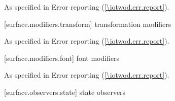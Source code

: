 \begin{itemdecl}
\end{itemdecl}
\begin{itemdescr}
\pnum
\effects


\pnum
\postconditions


\pnum
\throws
As specified in Error reporting (\ref{\iotwod.err.report}).


\pnum
\remarks


\pnum
\errors


\pnum
\realnotes


\end{itemdescr}

 [surface.modifiers.transform] { transformation modifiers}

\begin{itemdecl}
\end{itemdecl}
\begin{itemdescr}
\pnum
\effects


\pnum
\postconditions


\pnum
\throws
As specified in Error reporting (\ref{\iotwod.err.report}).


\pnum
\remarks


\pnum
\errors


\pnum
\realnotes


\end{itemdescr}


 [surface.modifiers.font] { font modifiers}

\begin{itemdecl}
\end{itemdecl}
\begin{itemdescr}
\pnum
\effects


\pnum
\postconditions


\pnum
\throws
As specified in Error reporting (\ref{\iotwod.err.report}).


\pnum
\remarks


\pnum
\errors


\pnum
\realnotes


\end{itemdescr}


 [surface.observers.state] { state observers}

